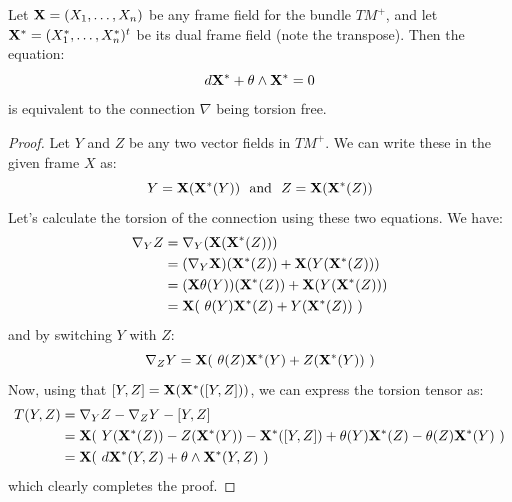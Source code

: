 \begin{prop} Let $\mathbf{X} = (X_1, \ldots, X_n)$ be any frame field for the bundle $TM^{+}$, and let $\mathbf{X}^{\ast} = ( X_1^{\ast}, \ldots, X_n^{\ast} )^t$ be its dual frame field (note the transpose).  Then the equation:
%
$$ d \mathbf{X}^{\ast} + \theta \wedge \mathbf{X}^{\ast} = 0$$
%
is equivalent to the connection $\nabla$ being torsion free.
\end{prop}

\begin{proof}
%
Let $Y$ and $Z$ be any two vector fields in $TM^{+}$.  We can write these in the given frame $X$ as:
%
$$ Y = \mathbf{X}( \mathbf{X}^{\ast}(Y) ) \ \text{ and } \ Z = \mathbf{X}( \mathbf{X}^{\ast}(Z) ) $$
%
Let's calculate the torsion of the connection using these two equations.  We have:
%
\begin{align*}
\nabla_Y Z &= \nabla_Y ( \mathbf{X}( \mathbf{X}^{\ast}(Z) ) ) \\
&= (\nabla_Y \mathbf{X}) ( \mathbf{X}^{\ast}(Z) ) + \mathbf{X}( Y( \mathbf{X}^{\ast}(Z) ) ) \\
&= ( \mathbf{X} \theta(Y) ) ( \mathbf{X}^{\ast}(Z) ) + \mathbf{X}( Y( \mathbf{X}^{\ast}(Z) ) ) \\
&= \mathbf{X}( \ \theta(Y) \mathbf{X}^{\ast}(Z) + Y( \mathbf{X}^{\ast}(Z)) \ )
\end{align*}
%
and by switching $Y$ with $Z$:
%
$$ \nabla_Z Y = \mathbf{X}( \ \theta(Z) \mathbf{X}^{\ast}(Y) + Z( \mathbf{X}^{\ast}(Y)) \ ) $$
%
Now, using that $[Y,Z] = \mathbf{X}( \mathbf{X}^{\ast}( [Y,Z] ) )$, we can express the torsion tensor as:
%
\begin{align*}
T(Y,Z) &= \nabla_Y Z - \nabla_Z Y - [Y,Z] \\
&= \bldX( \ Y( \bldX^{\ast}(Z)) - Z( \bldX^{\ast}(Y)) - \bldX^{\ast}( [Y,Z] ) + \theta(Y) \bldX^{\ast}(Z) - \theta(Z) \bldX^{\ast}(Y) \ ) \\
&= \bldX( \ d \bldX^{\ast}(Y,Z) + \theta \wedge \bldX^{\ast} (Y,Z) \ )
\end{align*}
%
which clearly completes the proof.
%
\end{proof}

